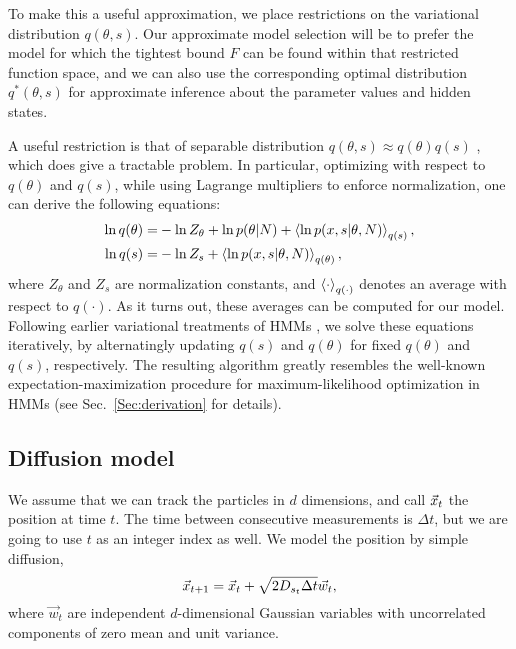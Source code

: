 To make this a useful approximation, we place restrictions on the
variational distribution $q(\theta,s)$. Our approximate model
selection will be to prefer the model for which the tightest bound $F$
can be found within that restricted function space, and we can also
use the corresponding optimal distribution $q^*(\theta,s)$ for
approximate inference about the parameter values and hidden
states\cite{Mackay2003, Bishop2006}.

A useful restriction is that of separable distribution
$q(\theta,s)\approx
q(\theta)q(s)$ \cite{Mackay1997,Beal2003,Bronson2009}, which does give
a tractable problem. In particular, optimizing with respect to
$q(\theta)$ and $q(s)$, while using Lagrange multipliers to enforce
normalization, one can derive the following equations:
\begin{align}
  \ln q(\theta)=&-\ln Z_\theta+\ln p(\theta|N)
  +\left\langle \ln p(x,s|\theta,N)\right\rangle_{q(s)},\label{eq:update1}\\
  \ln q(s)=&-\ln Z_s+\left\langle \ln p(x,s|\theta,N)\right\rangle_{q(\theta)},\label{eq:update2}
\end{align}
where $Z_\theta$ and $Z_s$ are normalization constants, and
$\left\langle \cdot\right\rangle_{q(\cdot)}$ denotes an average with respect to
$q(\cdot)$. As it turns out, these averages can be computed for our
model. Following earlier variational treatments of
HMMs \cite{Mackay1997,Beal2003,Bronson2009}, we solve these equations
iteratively, by alternatingly updating $q(s)$ and $q(\theta)$ for fixed
$q(\theta)$ and $q(s)$, respectively. The resulting algorithm greatly resembles the
well-known expectation-maximization procedure for maximum-likelihood
optimization in HMMs \cite{Ghahramani2002} (see
Sec.~\ref{Sec:derivation} for details).

\subsection{Diffusion model}
\label{Sec:esimodel}
We assume that we can track the particles in $d$ dimensions, and call
$\vec{x}_t$ the position at time $t$.  The time between consecutive
measurements is $\Delta t$, but we are going to use $t$ as an integer
index as well. We model the position by
simple diffusion,
\begin{equation}\label{eq:diff1}
        \vec{x}_{t+1}=\vec{x}_t+\sqrt{2D_{s_t}\Delta t}\vec{w}_t,
\end{equation}
where $\vec{w}_t$ are independent $d$-dimensional Gaussian variables
with uncorrelated components of zero mean and unit variance.

